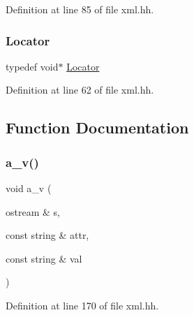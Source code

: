 Definition at line 85 of file xml.\+hh.

\mbox{\label{xml_8hh_ad34bc338f5e298a1993320898263b741}} 
\subsubsection{\texorpdfstring{Locator}{Locator}}
{\footnotesize\ttfamily typedef void$\ast$ \mbox{\hyperlink{xml_8hh_ad34bc338f5e298a1993320898263b741}{Locator}}}



Definition at line 62 of file xml.\+hh.



\subsection{Function Documentation}
\mbox{\label{xml_8hh_a0fa1b18d881c70abd1489da2ba2f6792}} 
\subsubsection{\texorpdfstring{a\_v()}{a\_v()}}
{\footnotesize\ttfamily void a\+\_\+v (\begin{DoxyParamCaption}\item[{ostream \&}]{s,  }\item[{const string \&}]{attr,  }\item[{const string \&}]{val }\end{DoxyParamCaption})\hspace{0.3cm}{\ttfamily [inline]}}



Definition at line 170 of file xml.\+hh.

